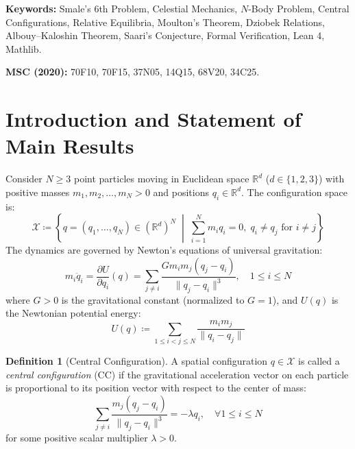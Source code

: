 \documentclass[11pt,a4paper]{article}
\theoremstyle{definition}
\newtheorem{definition}[theorem]{Definition}
\begin{document}
\vspace{0.5em}
\noindent\textbf{Keywords:} Smale's 6th Problem, Celestial Mechanics, $N$-Body Problem, Central Configurations, Relative Equilibria, Moulton's Theorem, Dziobek Relations, Albouy--Kaloshin Theorem, Saari's Conjecture, Formal Verification, Lean 4, Mathlib.

\noindent\textbf{MSC (2020):} 70F10, 70F15, 37N05, 14Q15, 68V20, 34C25.

\tableofcontents
\newpage

\section{Introduction and Statement of Main Results}

Consider $N \ge 3$ point particles moving in Euclidean space $\mathbb{R}^d$ ($d \in \{1, 2, 3\}$) with positive masses $m_1, m_2, \dots, m_N > 0$ and positions $q_i \in \mathbb{R}^d$. The configuration space is:
\begin{equation}\label{eq:config_space}
\mathcal{X} \coloneqq \left\{ q = (q_1, \dots, q_N) \in (\mathbb{R}^d)^N \;\middle|\; \sum_{i=1}^N m_i q_i = 0, \; q_i \ne q_j \text{ for } i \ne j \right\}
\end{equation}
The dynamics are governed by Newton's equations of universal gravitation:
\begin{equation}\label{eq:newton_law}
m_i \ddot{q}_i = \frac{\partial U}{\partial q_i}(q) = \sum_{j \ne i} \frac{G m_i m_j (q_j - q_i)}{\|q_j - q_i\|^3}, \quad 1 \le i \le N
\end{equation}
where $G > 0$ is the gravitational constant (normalized to $G = 1$), and $U(q)$ is the Newtonian potential energy:
\begin{equation}\label{eq:potential_energy}
U(q) \coloneqq \sum_{1 \le i < j \le N} \frac{m_i m_j}{\|q_i - q_j\|}
\end{equation}

\begin{definition}[Central Configuration]\label{def:central_config}
A spatial configuration $q \in \mathcal{X}$ is called a \emph{central configuration} (CC) if the gravitational acceleration vector on each particle is proportional to its position vector with respect to the center of mass:
\begin{equation}\label{eq:cc_equation}
\sum_{j \ne i} \frac{m_j (q_j - q_i)}{\|q_j - q_i\|^3} = -\lambda q_i, \quad \forall 1 \le i \le N
\end{equation}
for some positive scalar multiplier $\lambda > 0$.
\end{definition}
\end{document}
